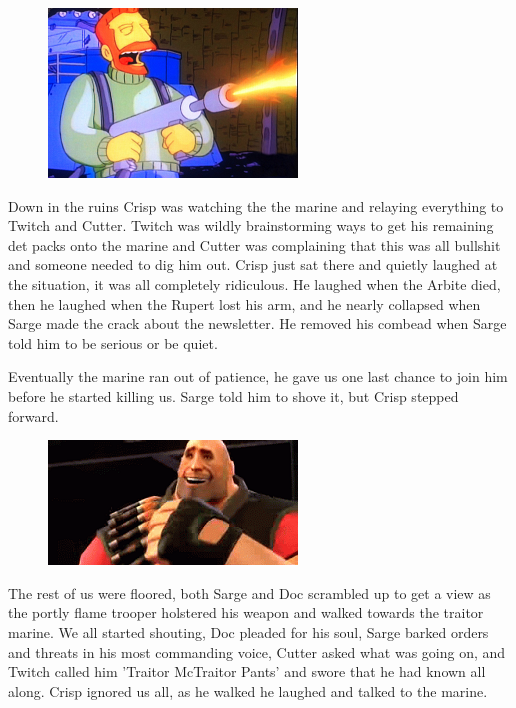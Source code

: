 \begin{figure}
	\begin{center}
		\includegraphics[width=\figwidth]{pics/6/48.png}
	\end{center}
\end{figure}
Down in the ruins Crisp was watching the the marine and relaying everything to Twitch and Cutter. 
Twitch was wildly brainstorming ways to get his remaining det packs onto the marine and Cutter was complaining that this was all bullshit and someone needed to dig him out. 
Crisp just sat there and quietly laughed at the situation, it was all completely ridiculous. 
He laughed when the Arbite died, then he laughed when the Rupert lost his arm, and he nearly collapsed when Sarge made the crack about the newsletter. 
He removed his combead when Sarge told him to be serious or be quiet.

Eventually the marine ran out of patience, he gave us one last chance to join him before he started killing us. 
Sarge told him to shove it, but Crisp stepped forward.

\begin{figure}
	\begin{center}
		\includegraphics[width=\figwidth]{pics/6/49.png}
	\end{center}
\end{figure}
The rest of us were floored, both Sarge and Doc scrambled up to get a view as the portly flame trooper holstered his weapon and walked towards the traitor marine. 
We all started shouting, Doc pleaded for his soul, Sarge barked orders and threats in his most commanding voice, Cutter asked what was going on, and Twitch called him 'Traitor McTraitor Pants' and swore that he had known all along. 
Crisp ignored us all, as he walked he laughed and talked to the marine.

